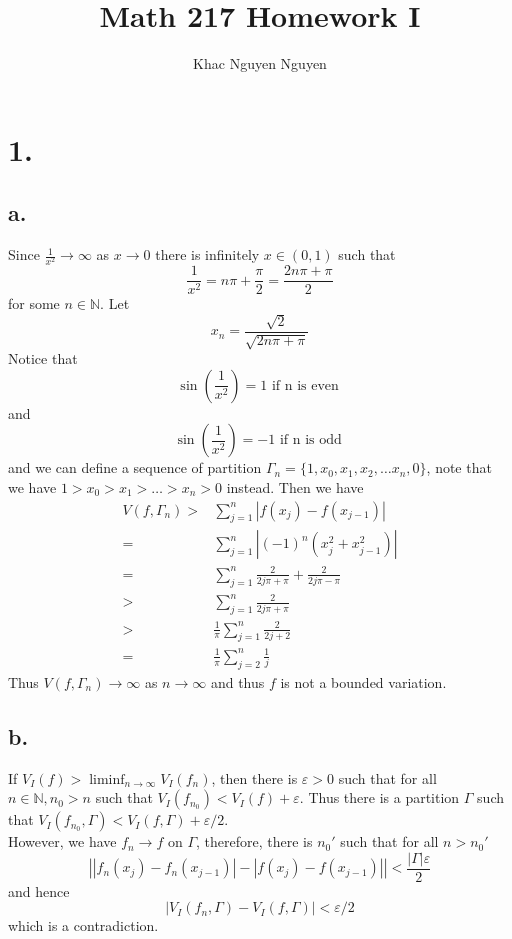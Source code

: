 \documentclass[11pt]{article}
\title{\textbf{Math 217 Homework I}}
\author{Khac Nguyen Nguyen}
\date{}
\theoremstyle{mystyle}
\theoremstyle{definition}
\begin{document}
\section*{1.}
\subsection*{a.}
Since $\displaystyle\frac{1}{x^2} \to \infty$ as $x \to 0$ there is infinitely $x \in (0,1)$ such that 
\[
  \displaystyle\frac{1}{x^2} = n\pi + \displaystyle\frac{\pi}{2} = \displaystyle\frac{2n\pi + \pi}{2}
\]
for some $n \in \mathbb{N}$. Let 
\[
  x_n = \displaystyle\frac{\sqrt{2}}{\sqrt{2n\pi + \pi}}
\]
Notice that 
\[
  \sin\left(\displaystyle\frac{1}{x^2}\right) = 1 \text{ if n is even }  
\]
and 
\[
  \sin\left(\displaystyle\frac{1}{x^2}\right) = -1 \text{ if n is odd }  
\]
and we can define a sequence of partition $\Gamma_n = \{1, x_0, x_1, x_2, \hdots x_n, 0\}$, note that we have $1> x_0 > x_1 > \hdots > x_n > 0$ instead. Then we have  
\begin{align*}
  V(f,\Gamma_n) >& \sum_{j=1}^n |f(x_j) - f(x_{j-1})| \\
  =& \sum_{j=1}^n \left|(-1)^n (x_j^2 + x_{j-1}^2)\right| \\
  =& \sum_{j=1}^n \displaystyle\frac{2}{2j\pi + \pi} + \displaystyle\frac{2}{2j\pi - \pi} \\ 
  >& \sum_{j=1}^n \displaystyle\frac{2}{2j\pi + \pi} \\
  >& \displaystyle\frac{1}{\pi} \sum_{j=1}^n \displaystyle\frac{2}{2j+2} \\
  =& \displaystyle\frac{1}{\pi} \sum_{j=2}^n \displaystyle\frac{1}{j} 
\end{align*}
Thus $V(f, \Gamma_n) \to \infty$ as $n \to \infty$ and thus $f$ is not a bounded variation. 
\subsection*{b.}
If $V_I(f) > \liminf_{n \to \infty} V_I(f_n)$, then there is $\varepsilon >0$ such that for all $n \in \mathbb{N}, n_0 > n$ such that $V_I(f_{n_0}) < V_I(f) + \varepsilon$. Thus there is a partition $\Gamma$ such that $V_I(f_{n_0}, \Gamma) < V_I(f, \Gamma) + \varepsilon/2$. \\
However, we have $f_n \to f$ on $\Gamma$, therefore, there is $n_0'$ such that for all $n>n_0'$ 
\[
  \left| |f_n(x_j) - f_n(x_{j-1})| - |f(x_j) - f(x_{j-1})| \right| < \displaystyle\frac{|\Gamma| \varepsilon}{2}
\]
and hence 
\[
  |V_I(f_n, \Gamma) - V_I(f, \Gamma)| < \varepsilon/2
\]
which is a contradiction. 
\end{document}
